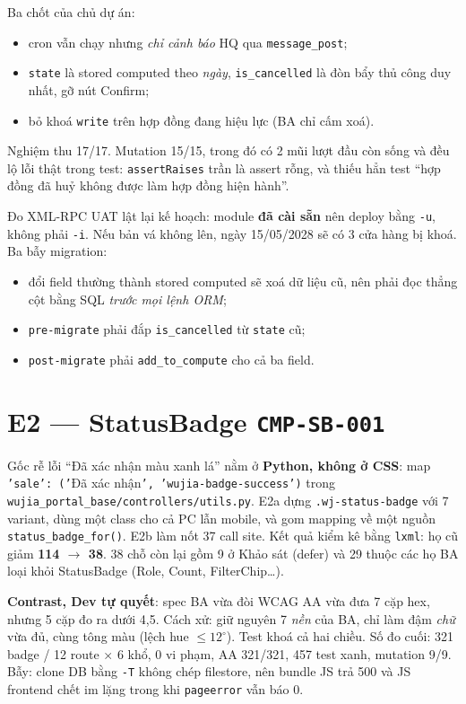 Ba chốt của chủ dự án:
\begin{itemize}[nosep]
\item cron vẫn chạy nhưng \emph{chỉ cảnh báo} HQ qua \texttt{message\_post};
\item \texttt{state} là stored computed theo \emph{ngày}, \texttt{is\_cancelled} là đòn bẩy thủ công duy nhất,
  gỡ nút Confirm;
\item bỏ khoá \texttt{write} trên hợp đồng đang hiệu lực (BA chỉ cấm xoá).
\end{itemize}
Nghiệm thu 17/17. Mutation 15/15, trong đó có 2 mũi lượt đầu còn sống và đều lộ lỗi thật trong test:
\texttt{assertRaises} trần là assert rỗng, và thiếu hẳn test ``hợp đồng đã huỷ không được làm hợp đồng
hiện hành''.

Đo XML-RPC UAT lật lại kế hoạch: module \textbf{đã cài sẵn} nên deploy bằng \texttt{-u}, không phải
\texttt{-i}. Nếu bản vá không lên, ngày 15/05/2028 sẽ có 3 cửa hàng bị khoá. Ba bẫy migration:
\begin{itemize}[nosep]
\item đổi field thường thành stored computed sẽ xoá dữ liệu cũ, nên phải đọc thẳng cột bằng SQL
  \emph{trước mọi lệnh ORM};
\item \texttt{pre-migrate} phải đắp \texttt{is\_cancelled} từ \texttt{state} cũ;
\item \texttt{post-migrate} phải \texttt{add\_to\_compute} cho cả ba field.
\end{itemize}

\section{E2 --- StatusBadge \texttt{CMP-SB-001}}

Gốc rễ lỗi ``Đã xác nhận màu xanh lá'' nằm ở \textbf{Python, không ở CSS}: map
\texttt{'sale': ('}Đã xác nhận\texttt{', 'wujia-badge-success')} trong \texttt{wujia\_portal\_base/controllers/utils.py}.
E2a dựng \texttt{.wj-status-badge} với 7 variant, dùng một class cho cả PC lẫn mobile, và gom mapping
về một nguồn \texttt{status\_badge\_for()}. E2b làm nốt 37 call site. Kết quả kiểm kê bằng \texttt{lxml}:
họ cũ giảm \textbf{114 $\to$ 38}. 38 chỗ còn lại gồm 9 ở Khảo sát (defer) và 29 thuộc các họ BA loại
khỏi StatusBadge (Role, Count, FilterChip…).

\textbf{Contrast, Dev tự quyết}: spec BA vừa đòi WCAG AA vừa đưa 7 cặp hex, nhưng 5 cặp đo ra dưới
4,5. Cách xử: giữ nguyên 7 \emph{nền} của BA, chỉ làm đậm \emph{chữ} vừa đủ, cùng tông màu (lệch hue
$\leq 12^\circ$). Test khoá cả hai chiều. Số đo cuối: 321 badge / 12 route × 6 khổ, 0 vi phạm, AA 321/321,
457 test xanh, mutation 9/9. Bẫy: clone DB bằng \texttt{-T} không chép filestore, nên bundle JS trả 500
và JS frontend chết im lặng trong khi \texttt{pageerror} vẫn báo 0.

